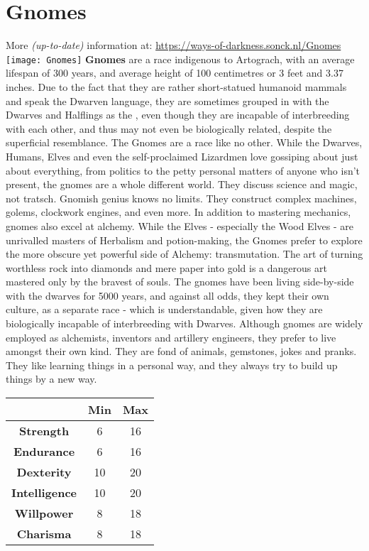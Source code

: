 \section{Gnomes}
More \textit{(up-to-date)} information at: \url{https://ways-of-darkness.sonck.nl/Gnomes}\newline
\texttt{[image: Gnomes]}\newline
\textbf{Gnomes} are a race indigenous to Artograch, with an average lifespan of 300 years, and average height of 100 centimetres or 3 feet and 3.37 inches. Due to the fact that they are rather short-statued humanoid mammals and speak the Dwarven language, they are sometimes grouped in with the Dwarves and Halflings as the , even though they are incapable of interbreeding with each other, and thus may not even be biologically related, despite the superficial resemblance.\newline
The Gnomes are a race like no other. While the Dwarves, Humans, Elves and even the self-proclaimed  Lizardmen love gossiping about just about everything, from politics to the petty personal matters of anyone who isn’t present, the gnomes are a whole different world. They discuss science and magic, not tratsch. Gnomish genius knows no limits. They construct complex machines, golems, clockwork engines, and even more. In addition to mastering mechanics, gnomes also excel at alchemy. While the Elves - especially the Wood Elves - are unrivalled masters of Herbalism and potion-making, the Gnomes prefer to explore the more obscure yet powerful side of Alchemy: transmutation. The art of turning worthless rock into diamonds and mere paper into gold is a dangerous art mastered only by the bravest of souls.\newline
The gnomes have been living side-by-side with the dwarves for 5000 years, and against all odds, they kept their own culture, as a separate race - which is understandable, given how they are biologically incapable of interbreeding with Dwarves. Although gnomes are widely employed as alchemists, inventors and artillery engineers, they prefer to live amongst their own kind. They are fond of animals, gemstones, jokes and pranks. They like learning things in a personal way, and they always try to build up things by a new way.\newline
\begin{tabular}{|c|c|c|}
\hline
 & \textbf{Min} & \textbf{Max} \\ \hline
\textbf{Strength} & 6 & 16 \\ \hline
\textbf{Endurance} & 6 & 16 \\ \hline
\textbf{Dexterity} & 10 & 20 \\ \hline
\textbf{Intelligence} & 10 & 20 \\ \hline
\textbf{Willpower} & 8 & 18 \\ \hline
\textbf{Charisma} & 8 & 18 \\ \hline
\end{tabular}\newline
{} \newpage

